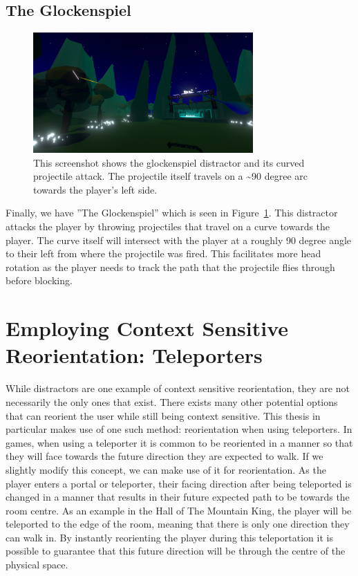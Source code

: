 \subsection{The Glockenspiel}
\begin{figure}[tbph]
    \centering
    \includegraphics[width=0.75\textwidth]{figures/screenshots/glockenspiel.png}
    \caption[The Glockenspiel Distractor]{This screenshot shows the glockenspiel distractor and its curved projectile attack. The projectile itself travels on a \textasciitilde90 degree arc towards the player's left side.}
    \label{fig:glockenspielDistractor}
\end{figure}
Finally, we have ''The Glockenspiel'' which is seen in Figure~\ref{fig:glockenspielDistractor}. This distractor attacks the player by throwing projectiles that travel on a curve towards the player. The curve itself will intersect with the player at a roughly 90 degree angle to their left from where the projectile was fired. This facilitates more head rotation as the player needs to track the path that the projectile flies through before blocking. 

\section{Employing Context Sensitive Reorientation: Teleporters}
While distractors are one example of context sensitive reorientation, they are not necessarily the only ones that exist. There exists many other potential options that can reorient the user while still being context sensitive. This thesis in particular makes use of one such method: reorientation when using teleporters. In games, when using a teleporter it is common to be reoriented in a manner so that they will face towards the future direction they are expected to walk. If we slightly modify this concept, we can make use of it for reorientation. As the player enters a portal or teleporter, their facing direction after being teleported is changed in a manner that results in their future expected path to be towards the room centre. As an example in the Hall of The Mountain King, the player will be teleported to the edge of the room, meaning that there is only one direction they can walk in. By instantly reorienting the player during this teleportation it is possible to guarantee that this future direction will be through the centre of the physical space. 

